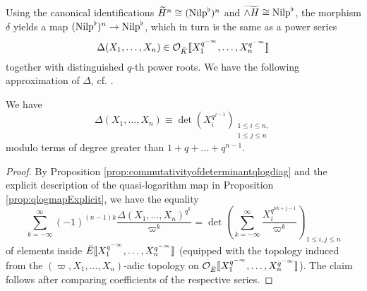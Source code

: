 \documentclass[../main.tex]{subfiles}
\begin{document}
Using the canonical identifications $\widetilde{H}^n \cong ({\mathrm{Nilp}}^\flat)^n$
and $\widetilde{\wedge H} \cong {\mathrm{Nilp}}^\flat$, the morphism $\delta$ yields a 
map $({\mathrm{Nilp}}^\flat)^n \to {\mathrm{Nilp}}^\flat$, which in turn is the same as a power series 
\begin{equation*}
  \Delta(X_1, \dots, X_n) \in \mathcal{O}_{\breve K}\llbracket X_1^{q^{-\infty}}, \dots,
  X_n^{q^{-\infty}}\rrbracket
\end{equation*}
together with distinguished $q$-th power roots. 
We have the following approximation of $\Delta$, cf. \cite[Lemma 2.10.4]{BoyarchenkoWeinstein2011MaxVar}. 
\begin{lem}\label{lem:DeltaApprox}
  We have 
  \begin{equation*}
    \Delta(X_1, \dots, X_n) \equiv \det(X_i^{q^{j-1}})_{\substack{1 \leq
  i \leq n,\\ 1 \leq j \leq n}} 
  \end{equation*}
  modulo terms of degree greater than $1 + q + \dots + q^{n-1}$.
\begin{proof}
  By Proposition \ref{prop:commutativityofdeterminantqlogdiag} and 
  the explicit description of the quasi-logarithm map in Proposition
  \ref{prop:qlogmapExplicit}, we have the equality
  \begin{equation*}
    \sum_{k = -\infty}^\infty (-1)^{(n-1) k} \frac{\Delta(X_1, \dots,
    X_n)^{q^k}}{\varpi^k} = 
    \det \left( \sum_{k = -\infty}^\infty
    \frac{X_i^{q^{nk + j-1}}}{\varpi^k} \right)_{1 \leq i, j \leq n}
  \end{equation*}
  of elements inside ${\breve {E}} \llbracket X_1^{q^{-\infty}}, \dots, X_n^{q^{-\infty}} \rrbracket$
  (equipped with the topology induced from the 
  $(\varpi, X_1, \allowbreak \dots, X_n)$-adic topology on $\mathcal{O}_{\breve {E}}\llbracket
  X_1^{q^{-\infty}}, \dots, X_n^{q^{-\infty}} \rrbracket$).
  The claim follows after comparing coefficients of the respective series. 
\end{proof}
\end{lem}



\end{document}
